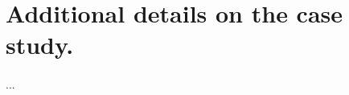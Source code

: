\documentclass{article}
\begin{document}
\section{Additional details on the case study.}

\paragraph{} ...
\end{document}
